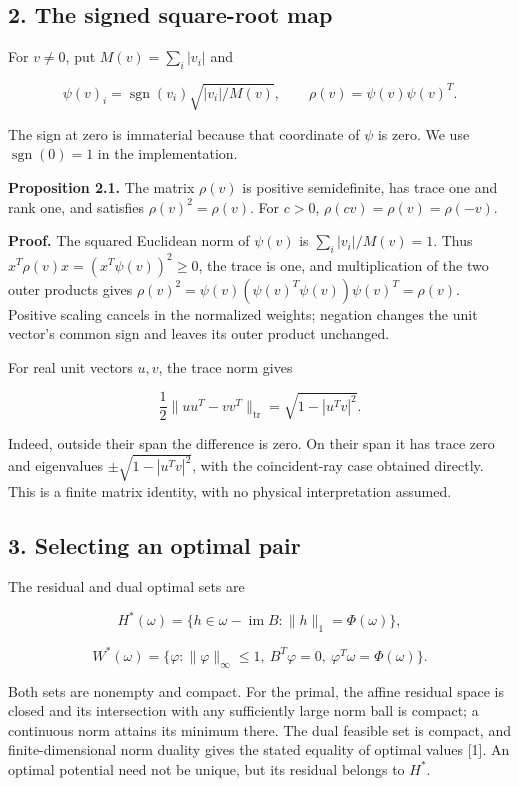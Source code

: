 \documentclass[
]{article}
\begin{document}
\subsection{2. The signed square-root
map}\label{the-signed-square-root-map}

For \(v\ne0\), put \(M(v)=\sum_i|v_i|\) and

\[
\psi(v)_i=\operatorname{sgn}(v_i)\sqrt{|v_i|/M(v)},\qquad
\rho(v)=\psi(v)\psi(v)^T.
\]

The sign at zero is immaterial because that coordinate of \(\psi\) is
zero. We use \(\operatorname{sgn}(0)=1\) in the implementation.

\textbf{Proposition 2.1.} The matrix \(\rho(v)\) is positive
semidefinite, has trace one and rank one, and satisfies
\(\rho(v)^2=\rho(v)\). For \(c>0\), \(\rho(cv)=\rho(v)=\rho(-v)\).

\textbf{Proof.} The squared Euclidean norm of \(\psi(v)\) is
\(\sum_i|v_i|/M(v)=1\). Thus \(x^T\rho(v)x=(x^T\psi(v))^2\ge0\), the
trace is one, and multiplication of the two outer products gives
\(\rho(v)^2=\psi(v)(\psi(v)^T\psi(v))\psi(v)^T=\rho(v)\). Positive
scaling cancels in the normalized weights; negation changes the unit
vector's common sign and leaves its outer product unchanged.

For real unit vectors \(u,v\), the trace norm gives

\[
\frac12\|uu^T-vv^T\|_{\mathrm{tr}}
 =\sqrt{1-|u^Tv|^2}.
\]

Indeed, outside their span the difference is zero. On their span it has
trace zero and eigenvalues \(\pm\sqrt{1-|u^Tv|^2}\), with the
coincident-ray case obtained directly. This is a finite matrix identity,
with no physical interpretation assumed.

\subsection{3. Selecting an optimal
pair}\label{selecting-an-optimal-pair}

The residual and dual optimal sets are

\[
H^*(\omega)=\{h\in\omega-\operatorname{im}B:\|h\|_1=\Phi(\omega)\},
\]

\[
W^*(\omega)=\{\varphi:\|\varphi\|_\infty\le1,\ B^T\varphi=0,
\ \varphi^T\omega=\Phi(\omega)\}.
\]

Both sets are nonempty and compact. For the primal, the affine residual
space is closed and its intersection with any sufficiently large norm
ball is compact; a continuous norm attains its minimum there. The dual
feasible set is compact, and finite-dimensional norm duality gives the
stated equality of optimal values {[}1{]}. An optimal potential need not
be unique, but its residual belongs to \(H^*\).
\end{document}

